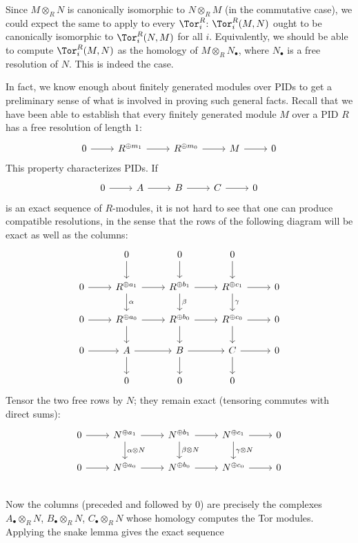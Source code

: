 Since $M\otimes_{R}N$ is canonically isomorphic to $N\otimes_{R}M$ (in the commutative case), we could expect the same to apply to every $\Tor^R_i$: $\Tor^R_i(M,N)$ ought to be canonically isomorphic to $\Tor^R_i(N,M)$ for all $i$. Equivalently, we should be able to compute $\Tor^R_i(M,N)$ as the homology of $M\otimes_{R}N_{\bullet}$, where $N_{\bullet}$ is a free resolution of $N$. This is indeed the case.\par
In fact, we know enough about finitely generated modules over PIDs to get a preliminary sense of what is involved in proving such general facts. Recall that we have been able to establish that every finitely generated module $M$ over a PID $R$ has a free resolution of length $1$:
\[\begin{tikzcd}
0\ar[r]&R^{\oplus m_1}\ar[r]&R^{\oplus m_0}\ar[r]&M\ar[r]&0
\end{tikzcd}\]
This property characterizes PIDs. If
\[\begin{tikzcd}
0\ar[r]&A\ar[r]&B\ar[r]&C\ar[r]&0
\end{tikzcd}\]
is an exact sequence of $R$-modules, it is not hard to see that one can produce compatible resolutions, in the sense that the rows of the following diagram will be exact as well as the columns:
\[
\begin{tikzcd}
&0\ar[d]&0\ar[d]&0\ar[d]&\\
0\ar[r]&R^{\oplus a_1}\ar[d,"\alpha"]\ar[r]&R^{\oplus b_1}\ar[d,"\beta"]\ar[r]&R^{\oplus c_1}\ar[d,"\gamma"]\ar[r]&0\\
0\ar[r]&R^{\oplus a_0}\ar[d]\ar[r]&R^{\oplus b_0}\ar[d]\ar[r]&R^{\oplus c_0}\ar[d]\ar[r]&0\\
0\ar[r]&A\ar[r]\ar[d]&B\ar[r]\ar[d]&C\ar[r]\ar[d]&0\\
&0&0&0&
\end{tikzcd}
\]
Tensor the two free rows by $N$; they remain exact (tensoring commutes with direct sums):
\[
\begin{tikzcd}
0\ar[r]&N^{\oplus a_1}\ar[d,"\alpha\otimes N"]\ar[r]&N^{\oplus b_1}\ar[d,"\beta\otimes N"]\ar[r]&N^{\oplus c_1}\ar[d,"\gamma\otimes N"]\ar[r]&0\\
0\ar[r]&N^{\oplus a_0}\ar[r]&N^{\oplus b_0}\ar[r]&N^{\oplus c_0}\ar[r]&0\\
\end{tikzcd}
\]
Now the columns (preceded and followed by $0$) are precisely the complexes $A_{\bullet}\otimes_{R}N$, $B_{\bullet}\otimes_{R}N$, $C_{\bullet}\otimes_{R}N$ whose homology computes the Tor modules. Applying the snake lemma gives the exact sequence
